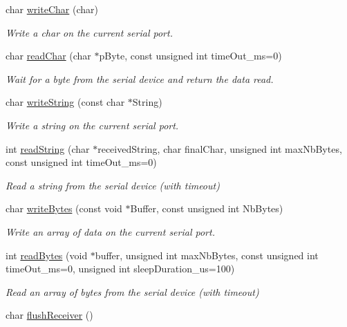 \begin{DoxyCompactItemize}
char \hyperlink{classserialib_aa6d231cb99664a613bcb503830f73497}{write\+Char} (char)
\begin{DoxyCompactList}\small\item\em Write a char on the current serial port. \end{DoxyCompactList}\item 
char \hyperlink{classserialib_a6c78b8a11ae7b8af57eea3dbc7fa237b}{read\+Char} (char $\ast$p\+Byte, const unsigned int time\+Out\+\_\+ms=0)
\begin{DoxyCompactList}\small\item\em Wait for a byte from the serial device and return the data read. \end{DoxyCompactList}\item 
char \hyperlink{classserialib_a6a32655c718b998e5b63d8cdc483ac6d}{write\+String} (const char $\ast$String)
\begin{DoxyCompactList}\small\item\em Write a string on the current serial port. \end{DoxyCompactList}\item 
int \hyperlink{classserialib_ab155c84352ddefe1304d391c19497ac1}{read\+String} (char $\ast$received\+String, char final\+Char, unsigned int max\+Nb\+Bytes, const unsigned int time\+Out\+\_\+ms=0)
\begin{DoxyCompactList}\small\item\em Read a string from the serial device (with timeout) \end{DoxyCompactList}\item 
char \hyperlink{classserialib_aa14196b6f422584bf5eebc4ddb71d483}{write\+Bytes} (const void $\ast$Buffer, const unsigned int Nb\+Bytes)
\begin{DoxyCompactList}\small\item\em Write an array of data on the current serial port. \end{DoxyCompactList}\item 
int \hyperlink{classserialib_ab05e51ff3bc47c02d7d000d58b45a961}{read\+Bytes} (void $\ast$buffer, unsigned int max\+Nb\+Bytes, const unsigned int time\+Out\+\_\+ms=0, unsigned int sleep\+Duration\+\_\+us=100)
\begin{DoxyCompactList}\small\item\em Read an array of bytes from the serial device (with timeout) \end{DoxyCompactList}\item 
char \hyperlink{classserialib_a572dd8d208511ec81d848de72cb05c7a}{flush\+Receiver} ()

\end{DoxyCompactItemize}
